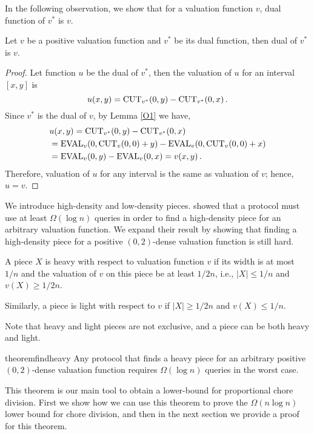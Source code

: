 In the following observation, we show that for a valuation function $v$, dual function of ${v^{*}}$ is $v$.
\begin{observation2}
\label{dualdual}
Let $v$ be a positive valuation function and $v^*$ be its dual function, then dual of $v^*$ is $v$. 
\end{observation2}
\begin{proof}
Let function $u$ be the dual of $v^*$, then the valuation of $u$ for an interval $[x,y]$ is
$$
u(x,y) = {\operatorname{CUT}}_{v^*}(0,y) - {\operatorname{CUT}}_{v^*}(0,x) \,.
$$
Since $v^*$ is the dual of $v$, by Lemma \ref{O1} we have,
\begin{align*}
&u(x,y) = {\operatorname{CUT}}_{v^*}(0,y) - {\operatorname{CUT}}_{v^*}(0,x) \\
&= {\operatorname{EVAL}}_v(0,{\operatorname{CUT}}_v(0,0)+y) - {\operatorname{EVAL}}_v(0,{\operatorname{CUT}}_v(0,0)+x) \\
&= {\operatorname{EVAL}}_v(0,y) - {\operatorname{EVAL}}_v(0,x) = v(x,y) \,. 
\end{align*}
Therefore, valuation of $u$ for any interval is the same as valuation of $v$; hence, $u=v$.
\end{proof}

We introduce high-density and low-density pieces.  showed that a protocol must use at least $\Omega ( \log n)$ queries in order to find a high-density piece for an arbitrary valuation function. We expand their result by showing that finding a high-density piece for a positive $(0,2)$-dense valuation function is still hard.
\begin{definition}
A piece $X$ is heavy with respect to valuation function $v$ if its width is at most $1/n$ and the valuation of $v$ on this piece be at least $1/2n$, i.e., $|X| \le 1/n$ and $v(X) \ge 1/2n$.

Similarly, a piece is light with respect to $v$ if $|X| \ge 1/2n$ and $v(X) \le 1/n$.
\end{definition}
Note that heavy and light pieces are not exclusive, and a piece can be both heavy and light.

\begin{restatable}{theorem}{findheavy}
\label{findheavy}
Any protocol that finds a heavy piece for an arbitrary positive $(0,2)$-dense valuation function requires $\Omega(\log n)$ queries in the worst case.
\end{restatable}
This theorem is our main tool to obtain a lower-bound for proportional chore division. First we show how we can use this theorem to prove the $\Omega( n \log n)$ lower bound for chore division, and then in the next section we provide a proof for this theorem.

